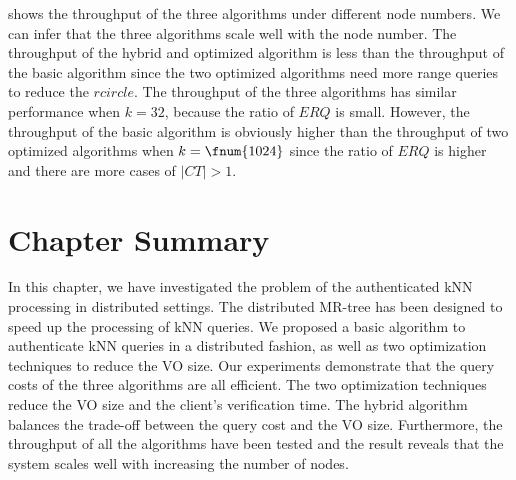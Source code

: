  shows the throughput of the three algorithms under different node numbers. We can infer that the three algorithms scale well with the node number. The throughput of the hybrid and optimized algorithm is less than the throughput of the basic algorithm since the two optimized algorithms need more range queries to reduce the $rcircle$. The throughput of the three algorithms has similar performance when $k=32$, because the ratio of $ERQ$ is small. However, the throughput of the basic algorithm is obviously higher than the throughput of two optimized algorithms when $k=\fnum{1024}$ since the ratio of $ERQ$ is higher and there are more cases of $|CT|>1$.

\section{Chapter Summary}\label{sec:knn:summary}
In this chapter, we have investigated the problem of the authenticated kNN processing in distributed settings. The distributed MR-tree has been designed to speed up the processing of kNN queries. We proposed a basic algorithm to authenticate kNN queries in a distributed fashion, as well as two optimization techniques to reduce the VO size. Our experiments demonstrate that the query costs of the three algorithms are all efficient. The two optimization techniques reduce the VO size and the client's verification time. The hybrid algorithm balances the trade-off between the query cost and the VO size. Furthermore, the throughput of all the algorithms have been tested and the result reveals that the system scales well with increasing the number of nodes.

